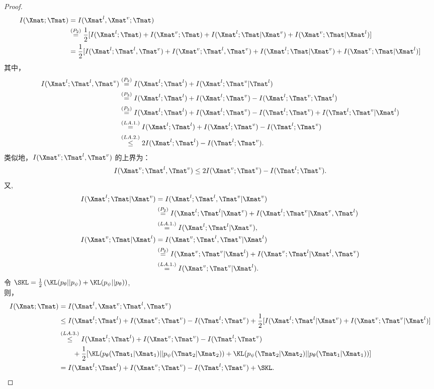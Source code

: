 \begin{proof}
\begin{align*}
I(\Xmat; \Tmat) &= I(\Xmat^l, \Xmat^v; \Tmat) \\
&\stackrel{(P_2)}{=}\frac{1}{2}[I(\Xmat^l; \Tmat) + I(\Xmat^v; \Tmat) + I(\Xmat^l; \Tmat|\Xmat^v) + I(\Xmat^v; \Tmat|\Xmat^l)]\\
&=\frac{1}{2}[I(\Xmat^l; \Tmat^l, \Tmat^v) + I(\Xmat^v; \Tmat^l, \Tmat^v) + I(\Xmat^l; \Tmat|\Xmat^v) + I(\Xmat^v; \Tmat|\Xmat^l)]
\end{align*}
其中，
\begin{align*}
I(\Xmat^l; \Tmat^l, \Tmat^v) &\stackrel{(P_2)}{=}I(\Xmat^l; \Tmat^l) + I(\Xmat^l; \Tmat^v|\Tmat^l) \\ 
&\stackrel{(P_3)}{=}I(\Xmat^l; \Tmat^l) + I(\Xmat^l; \Tmat^v) - I(\Xmat^l; \Tmat^v; \Tmat^l)\\
&\stackrel{(P_3)}{=}I(\Xmat^l; \Tmat^l) + I(\Xmat^l; \Tmat^v) - I(\Tmat^l; \Tmat^v) + I(\Tmat^l; \Tmat^v|\Xmat^l) \\
&\stackrel{(LA.1.)}{=}I(\Xmat^l; \Tmat^l) + I(\Xmat^l; \Tmat^v) - I(\Tmat^l; \Tmat^v)\\ 
&\stackrel{(LA.2.)}{\le}2I(\Xmat^l; \Tmat^l) - I(\Tmat^l; \Tmat^v). 
\end{align*}
类似地，$I(\Xmat^v; \Tmat^l, \Tmat^v)$ 的上界为： 
\begin{align*}
I(\Xmat^v; \Tmat^l, \Tmat^v) \le 2I(\Xmat^v; \Tmat^v) - I(\Tmat^l; \Tmat^v). 
\end{align*} 
又, 
\begin{align*}
I(\Xmat^l; \Tmat|\Xmat^v) &= I(\Xmat^l; \Tmat^l, \Tmat^v|\Xmat^v)\\
&\stackrel{(P_2)}{=} I(\Xmat^l; \Tmat^l|\Xmat^v) + I(\Xmat^l; \Tmat^v|\Xmat^v,\Tmat^l) \\ 
&\stackrel{(LA.1.)}{=} I(\Xmat^l; \Tmat^l|\Xmat^v), \\ 
% 
I(\Xmat^v; \Tmat|\Xmat^l) &= I(\Xmat^v; \Tmat^l, \Tmat^v|\Xmat^l)\\
&\stackrel{(P_2)}{=} I(\Xmat^v; \Tmat^v|\Xmat^l) + I(\Xmat^v; \Tmat^l|\Xmat^l,\Tmat^v) \\ 
&\stackrel{(LA.1.)}{=} I(\Xmat^v; \Tmat^v|\Xmat^l). \\ 
\end{align*}
令 $\SKL=\frac{1}{2}\left(\KL(p_\theta||p_\psi) + \KL(p_\psi||p_\theta)\right)$, \\ 
则，
\begin{align*}
I(\Xmat; \Tmat) &= I(\Xmat^l, \Xmat^v; \Tmat^l, \Tmat^v)\\
&\le I(\Xmat^l; \Tmat^l) + I(\Xmat^v; \Tmat^v) - I(\Tmat^l; \Tmat^v) + \frac{1}{2}[I(\Xmat^l; \Tmat^l|\Xmat^v) + I(\Xmat^v; \Tmat^v|\Xmat^l)]\\ 
&\stackrel{(LA.3.)}{\le} I(\Xmat^l; \Tmat^l) + I(\Xmat^v; \Tmat^v) - I(\Tmat^l; \Tmat^v)\\
&\qquad + \frac{1}{2}[\KL(p_\theta(\Tmat_1|\Xmat_1)||p_\psi(\Tmat_2|\Xmat_2)) + \KL(p_\psi(\Tmat_2|\Xmat_2)||p_\theta(\Tmat_1|\Xmat_1))]\\
&=I(\Xmat^l; \Tmat^l) + I(\Xmat^v; \Tmat^v) - I(\Tmat^l; \Tmat^v) + \SKL. 
\end{align*}
\end{proof}

